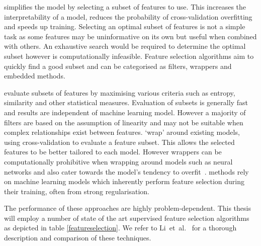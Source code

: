 \documentclass[12pt, twoside]{book}
\renewcommand\emph[1]{\textit{\color{USred}{#1}}}
\begin{document}
\emph{Feature selection} simplifies the model by selecting a subset of features to use. This increases the interpretability of a model, reduces the probability of cross-validation overfitting~\cite{overfittingcv} and speeds up training. Selecting an optimal subset of features is not a simple task as some features may be uninformative on its own but useful when combined with others. An exhaustive search would be required to determine the optimal subset however is computationally infeasible. Feature selection algorithms aim to quickly find a good subset and can be categorised as filters, wrappers and embedded methods. 

\emph{Filters} evaluate subsets of features by maximising various criteria such as entropy, similarity and other statistical measures. Evaluation of subsets is generally fast and results are independent of machine learning model. However a majority of filters are based on the assumption of linearity and may not be suitable when complex relationships exist between features. \emph{Wrappers} `wrap' around existing models, using cross-validation to evaluate a feature subset. This allows the selected features to be better tailored to each model. However wrappers can be computationally prohibitive when wrapping around models such as neural networks and also cater towards the model's tendency to overfit~\cite{wrapperoverfit}. \emph{Embedded} methods rely on machine learning models which inherently perform feature selection during their training, often from strong regularisation. 

The performance of these approaches are highly problem-dependent. This thesis will employ a number of state of the art supervised feature selection algorithms as depicted in table \ref{featureselection}.  We refer to Li~et~al.~\cite{skfeature} for a thorough description and comparison of these techniques. 
\end{document}
